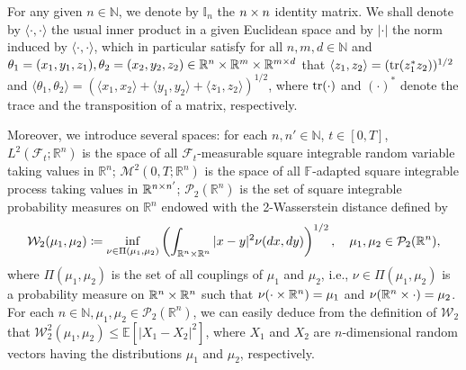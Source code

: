 \documentclass[11pt]{article}
\numberwithin{equation}{section}
\theoremstyle{definition}
\theoremstyle{remark}
\newcommand{\q}{\quad}   \newcommand{\qq}{\qquad}
\def \la{\langle} \def\ra{\rangle}
\def\cF{\mathcal{F}}
\def\cM{\mathcal{M}}
\def\cP{\mathcal{P}}
\def\cW{\mathcal{W}}
\def\sE{{\mathbb{E}}}
\def\sF{{\mathbb{F}}}
\def\sI{{\mathbb{I}}}
\def\sN{{\mathbb{N}}}
\def\sP{\mathbb{P}}
\def\sR{{\mathbb R}}
\newcommand{\tr}{\textnormal{tr}}
\begin{document}
For any given $n\in \sN$, we  denote by 
  $\sI_n$  the $n\times n$ identity matrix.
We shall denote by $\la \cdot,\cdot\ra$
the usual inner product in a given Euclidean space
and by   $|\cdot|$ the norm induced by $\la \cdot,\cdot\ra$,
which in particular satisfy  for all 
$n,m,d\in \sN$
and
$\theta_1=(x_1,y_1,z_1),\theta_2=(x_2,y_2,z_2)\in \sR^n\t \sR^m\t \sR^{m\t d}$
that
$\la z_1,z_2\ra =(\tr(z^*_1z_2))^{1/2}$
and 
$\la \theta_1,\theta_2\ra =(\la x_1,x_2\ra+\la y_1,y_2\ra+\la z_1,z_2\ra)^{1/2}$,
where 
$\tr(\cdot)$ 
and
$(\cdot)^*$ denote the     trace and the transposition  of a matrix, respectively.


Moreover,
we introduce several spaces:
for each %
 $n,n'\in \sN$,
 $t\in [0,T]$,
$L^2(\cF_t; \sR^n)$ is the space  of 
all $\cF_t$-measurable
square integrable random variable  taking values
in $\sR^n$;
 $\cM^2(0, T; \sR^{n})$ is the space of all $\sF$-adapted 
square integrable process  taking values in $\sR^{n\t n'}$;
$\cP_2(\sR^{n})$ is the set of 
square integrable
probability measures on $\sR^{n}$ 
endowed with the  2-Wasserstein distance defined by 
$$
\cW_2(\mu_1,\mu_2)
\coloneqq \inf_{\nu\in \Pi(\mu_1,\mu_2)} \left(\int_{\sR^{n}\t \sR^{n}}|x-y|^2\nu(dx,dy)\right)^{1/2},
\q \mu_1,\mu_2\in \cP_2(\sR^{n}),
$$
where $\Pi(\mu_1,\mu_2)$ is the set of all couplings of $\mu_1$ and $\mu_2$, i.e.,
$\nu\in \Pi(\mu_1,\mu_2)$ is a probability measure on $\sR^{n}\t \sR^{n}$ such that $\nu(\cdot\t \sR^{n})=\mu_1$ 
and $\nu(\sR^{n}\t \cdot)=\mu_2$.
For each $n\in \sN, \mu_1,\mu_2\in \cP_2(\sR^{n})$,
we can easily deduce from  the definition of $\cW_2$ that
$\cW^2_2(\mu_1,\mu_2)\le \sE[|X_1-X_2|^2]$,
 where $X_1$ and $X_2$ are $n$-dimensional random vectors having the distributions 
 $\mu_1$ and $\mu_2$, respectively.
\end{document}
